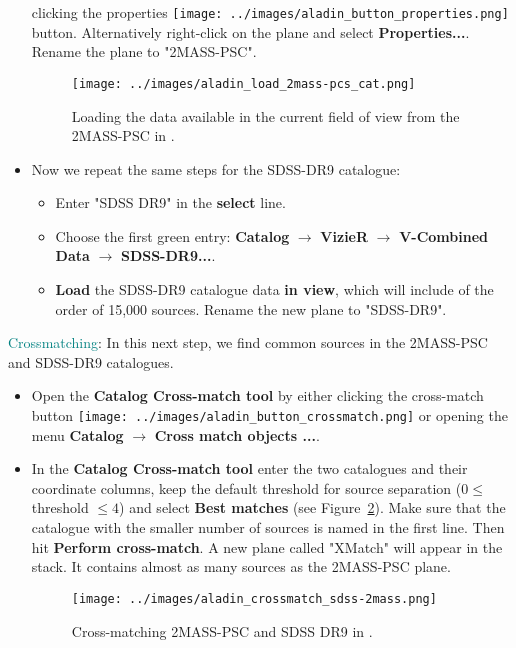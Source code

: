 \documentclass [a4paper, 12pt]{article}
\begin{document}
\begin{itemize}
    clicking the properties \texttt{[image: ../images/aladin\_button\_properties.png]} button. Alternatively
    right-click on the plane and select \textbf{Properties...}. Rename the
    plane to "2MASS-PSC".
    \begin{figure}[H]
        \center
        \texttt{[image: ../images/aladin\_load\_2mass-pcs\_cat.png]}
        \caption{Loading the data available in the current field of view from
        the 2MASS-PSC in \aladin.}
        \label{fig:load_2mass_aladin}
    \end{figure}
    \item Now we repeat the same steps for the SDSS-DR9 catalogue:
    \begin{itemize}
        \item Enter "SDSS DR9" in the \textbf{select} line.
        \item Choose the first green entry: \textbf{Catalog} $\rightarrow$
        \textbf{VizieR} $\rightarrow$ \textbf{V-Combined Data} $\rightarrow$
        \textbf{SDSS-DR9...}.
        \item \textbf{Load} the SDSS-DR9 catalogue data \textbf{in view}, which
        will include of the order of 15,000 sources. Rename the new plane to
        "SDSS-DR9".
    \end{itemize}
\end{itemize}

\noindent \textcolor{teal}{Crossmatching}: In this next step, we find common
sources in
the 2MASS-PSC and SDSS-DR9 catalogues.
\begin{itemize}
    \item Open the \textbf{Catalog Cross-match tool} by either clicking the
    cross-match button \texttt{[image: ../images/aladin\_button\_crossmatch.png]} or opening the menu
    \textbf{Catalog} $\rightarrow$ \textbf{Cross match objects ...}.
    \item In the \textbf{Catalog Cross-match tool} enter the two catalogues and
    their coordinate columns, keep the default threshold for source separation
    ($0 \le $ threshold $\le 4$) and select \textbf{Best matches} (see
    Figure~\ref{fig:crossmatch_2mass_sdss_aladin}). Make sure
    that the catalogue with the smaller number of sources is named in the first
    line. Then hit \textbf{Perform cross-match}. A new plane called "XMatch"
    will appear in the stack. It contains almost as many sources as the
    2MASS-PSC plane.
    \begin{figure}[H]
        \center
        \texttt{[image: ../images/aladin\_crossmatch\_sdss-2mass.png]}
        \caption{Cross-matching 2MASS-PSC and SDSS DR9 in \aladin.}
        \label{fig:crossmatch_2mass_sdss_aladin}
    \end{figure}
\end{itemize}
\end{document}
